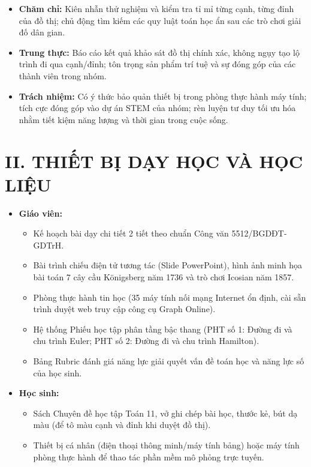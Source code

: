 \documentclass[12pt, a4paper]{article}
\begin{document}
\begin{itemize}[leftmargin=1.2cm]
    \item \textbf{Chăm chỉ:} Kiên nhẫn thử nghiệm và kiểm tra tỉ mỉ từng cạnh, từng đỉnh của đồ thị; chủ động tìm kiếm các quy luật toán học ẩn sau các trò chơi giải đố dân gian.
    \item \textbf{Trung thực:} Báo cáo kết quả khảo sát đồ thị chính xác, không ngụy tạo lộ trình đi qua cạnh/đỉnh; tôn trọng sản phẩm trí tuệ và sự đóng góp của các thành viên trong nhóm.
    \item \textbf{Trách nhiệm:} Có ý thức bảo quản thiết bị trong phòng thực hành máy tính; tích cực đóng góp vào dự án STEM của nhóm; rèn luyện tư duy tối ưu hóa nhằm tiết kiệm năng lượng và thời gian trong cuộc sống.
\end{itemize}

\section*{II. THIẾT BỊ DẠY HỌC VÀ HỌC LIỆU}

\begin{itemize}[leftmargin=1.2cm]
    \item \textbf{Giáo viên:}
    \begin{itemize}[leftmargin=0.6cm]
        \item Kế hoạch bài dạy chi tiết 2 tiết theo chuẩn Công văn 5512/BGDĐT-GDTrH.
        \item Bài trình chiếu điện tử tương tác (Slide PowerPoint), hình ảnh minh họa bài toán 7 cây cầu Königsberg năm 1736 và trò chơi Icosian năm 1857.
        \item Phòng thực hành tin học (35 máy tính nối mạng Internet ổn định, cài sẵn trình duyệt web truy cập công cụ Graph Online).
        \item Hệ thống Phiếu học tập phân tầng bậc thang (PHT số 1: Đường đi và chu trình Euler; PHT số 2: Đường đi và chu trình Hamilton).
        \item Bảng Rubric đánh giá năng lực giải quyết vấn đề toán học và năng lực số của học sinh.
    \end{itemize}

    \item \textbf{Học sinh:}
    \begin{itemize}[leftmargin=0.6cm]
        \item Sách Chuyên đề học tập Toán 11, vở ghi chép bài học, thước kẻ, bút dạ màu (để tô màu cạnh và đỉnh khi duyệt đồ thị).
        \item Thiết bị cá nhân (điện thoại thông minh/máy tính bảng) hoặc máy tính phòng thực hành để thao tác phần mềm mô phỏng trực tuyến.
    \end{itemize}
\end{itemize}
\end{document}
